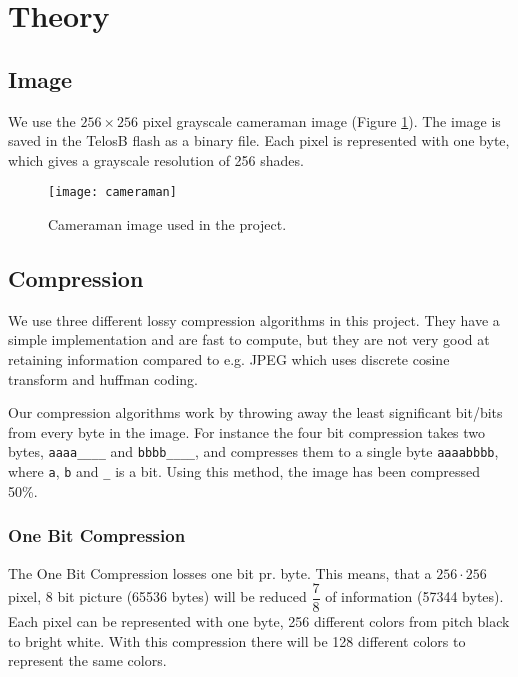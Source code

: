 \section{Theory}

\subsection{Image}
We use the $256 \times 256$ pixel grayscale cameraman image (Figure \ref{fig:image_cameraman}). The image is saved in the TelosB flash as a binary file. Each pixel is represented with one byte, which gives a grayscale resolution of 256 shades.

\begin{figure}[ht!]
\centering
\texttt{[image: cameraman]}
\caption{Cameraman image used in the project.}
\label{fig:image_cameraman}
\end{figure}

\subsection{Compression}

We use three different lossy compression algorithms in this project.
They have a simple implementation and are fast to compute, but they are not very good at retaining information compared to e.g. JPEG which uses discrete cosine transform and huffman coding.

Our compression algorithms work by throwing away the least significant bit/bits from every byte in the image.
For instance the four bit compression takes two bytes, \texttt{aaaa\_\_\_\_} and \texttt{bbbb\_\_\_\_}, and compresses them to a single byte \texttt{aaaabbbb}, where \texttt{a}, \texttt{b} and \texttt{\_} is a bit. Using this method, the image has been compressed 50\%.


\subsubsection{One Bit Compression} %
\label{sub:one_bit_compression}
\FloatBarrier

The One Bit Compression losses one bit pr. byte.
This means, that a $256 \cdot 256$ pixel, 8 bit picture (65536 bytes) will be reduced $\dfrac{7}{8}$ of information (57344 bytes).
Each pixel can be represented with one byte, 256 different colors from pitch black to bright white.
With this compression there will be 128 different colors to represent the same colors.

